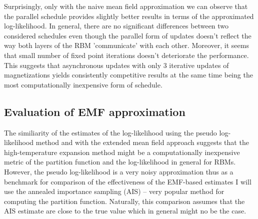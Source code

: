 Surprisingly, only with the naive mean field approximation we can observe that the parallel schedule provides slightly better results in terms of the approximated log-likelihood. In general, there are no significant differences between two considered schedules even though the parallel form of updates doesn't reflect the way both layers of the RBM 'communicate' with each other. Moreover, it seems that small number of fixed point iterations doesn't deteriorate the performance. This suggests that asynchronous updates with only $3$ iterative updates of magnetizations yields consistently competitive results at the same time being the most computationally inexpensive form of schedule.

\subsection{Evaluation of EMF approximation}
The similiarity of the estimates of the log-likelihood using the pseudo log-likelihood method and with the extended mean field approach suggests that the high-temperature expansion method might be a computationally inexpensive metric of the partition function and the log-likelihood in general for RBMs. However, the pseudo log-likelihood is a very noisy approximation thus as a benchmark for comparison of the effectiveness of the EMF-based estimates I will use the annealed importance sampling (AIS) \cite{neal2001annealed} -- very popular method for computing the partition function. Naturally, this comparison assumes that the AIS estimate are close to the true value which in general might no be the case.
